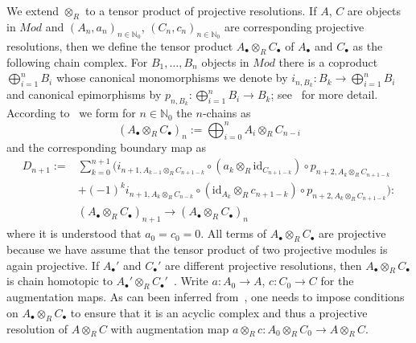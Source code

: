 \documentclass[12pt, a4paper]{article}
\numberwithin{equation}{section}
\theoremstyle{empty}
\theoremstyle{nonumberplain}
\begin{document}
We extend $\otimes_R$ to a tensor product of projective resolutions. If $A$, $C$ are objects in $Mod$ and $(A_n, a_n)_{n \in \mathbb{N}_0}$, $(C_n,c _n)_{n \in \mathbb{N}_0}$ are corresponding projective resolutions, then we define the tensor product $A_{\bullet} \otimes_R C_{\bullet}$ of $A_{\bullet}$ and $C_{\bullet}$ as the following chain complex. For $B_1, \dots, B_n$ objects in $Mod$ there is a coproduct $\bigoplus_{i = 1}^n B_i$ whose canonical monomorphisms we denote by $i_{n, B_k}: B_k \rightarrow \bigoplus_{i = 1}^n B_i$ and canonical epimorphisms by $p_{n, B_k}: \bigoplus_{i = 1}^n B_i \rightarrow B_k$; see~\cite[p.~250--251]{mac95} for more detail. According to~\cite[p.~163]{mac95} we form for $n \in \mathbb{N}_0$ the $n$-chains as
\[ (A_{\bullet} \otimes_R C_{\bullet})_n := \bigoplus_{i = 0}^n A_i \otimes_R C_{n-i} \]
and the corresponding boundary map as
\begin{align}
D_{n+1} := &\sum_{k = 0}^{n+1}\big(i_{n+1, A_{k-1} \otimes_R C_{n+1-k}} \circ (a_k \otimes_R \mathrm{id}_{C_{n+1-k}}) \circ p_{n+2, A_k \otimes_R C_{n+1-k}} \nonumber  \\
&+ (-1)^k i_{n+1, A_k \otimes_R C_{n-k}} \circ (\mathrm{id}_{A_k} \otimes_R c_{n+1-k}) \circ p_{n+2, A_k \otimes_R C_{n+1-k}}\big): \label{eq:tensordifferential} \\
&(A_{\bullet} \otimes_R C_{\bullet})_{n+1} \rightarrow (A_{\bullet} \otimes_R C_{\bullet})_n \nonumber
\end{align}
where it is understood that $a_0 = c_0 = 0$. All terms of $A_{\bullet} \otimes_R C_{\bullet}$ are projective because we have assume that the tensor product of two projective modules is again projective. If $A_{\bullet}'$ and $C_{\bullet}'$ are different projective resolutions, then $A_{\bullet} \otimes_R C_{\bullet}$ is chain homotopic to $A_{\bullet}' \otimes_R C_{\bullet}'$~\cite[p.~164]{mac95}. Write $a: A_0 \rightarrow A$, $c: C_0 \rightarrow C$ for the augmentation maps. As can been inferred from~\cite[p.~164/229]{mac95}, one needs to impose conditions on $A_{\bullet} \otimes_R C_{\bullet}$ to ensure that it is an acyclic complex and thus a projective resolution of $A \otimes_R C$ with augmentation map $a \otimes_R c: A_0 \otimes_R C_0 \rightarrow A \otimes_R C$. \\
\end{document}
